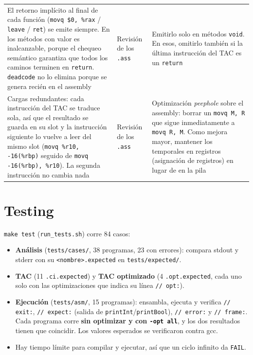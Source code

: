 \documentclass[11pt,a4paper]{article}
\newcommand{\code}[1]{\texttt{#1}}
\begin{document}
{\begin{tabularx}{\textwidth}{P{5.6cm}LL}
El retorno implícito al final de cada función (\code{movq \$0, \%rax} / \code{leave} / \code{ret}) se emite siempre. En los métodos con valor es inalcanzable, porque el chequeo semántico garantiza que todos los caminos terminen en \code{return}. \code{deadcode} no lo elimina porque se genera recién en el assembly & Revisión de los \code{.ass} & Emitirlo solo en métodos \code{void}. En esos, omitirlo también si la última instrucción del TAC es un \code{return} \\
Cargas redundantes: cada instrucción del TAC se traduce sola, así que el resultado se guarda en su slot y la instrucción siguiente lo vuelve a leer del mismo slot (\code{movq \%r10, -16(\%rbp)} seguido de \code{movq -16(\%rbp), \%r10}). La segunda instrucción no cambia nada & Revisión de los \code{.ass} & Optimización \textit{peephole} sobre el assembly: borrar un \code{movq M, R} que sigue inmediatamente a \code{movq R, M}. Como mejora mayor, mantener los temporales en registros (asignación de registros) en lugar de en la pila \\
\bottomrule
\end{tabularx}
}

\section*{Testing}

\code{make test} (\code{run\_tests.sh}) corre 84 casos:

\begin{itemize}
  \item \textbf{Análisis} (\code{tests/cases/}, 38 programas, 23 con errores): compara stdout y stderr con su \code{<nombre>.expected} en \code{tests/expected/}.
  \item \textbf{TAC} (11 \code{.ci.expected}) y \textbf{TAC optimizado} (4 \code{.opt.expected}, cada uno solo con las optimizaciones que indica su línea \code{// opt:}).
  \item \textbf{Ejecución} (\code{tests/asm/}, 15 programas): ensambla, ejecuta y verifica \code{// exit:}, \code{// expect:} (salida de \code{printInt}/\code{printBool}), \code{// error:} y \code{// frame:}. Cada programa corre \textbf{sin optimizar y con \code{-opt all}}, y los dos resultados tienen que coincidir. Los valores esperados se verificaron contra gcc.
  \item Hay tiempo límite para compilar y ejecutar, así que un ciclo infinito da \code{FAIL}.
\end{itemize}
\end{document}

